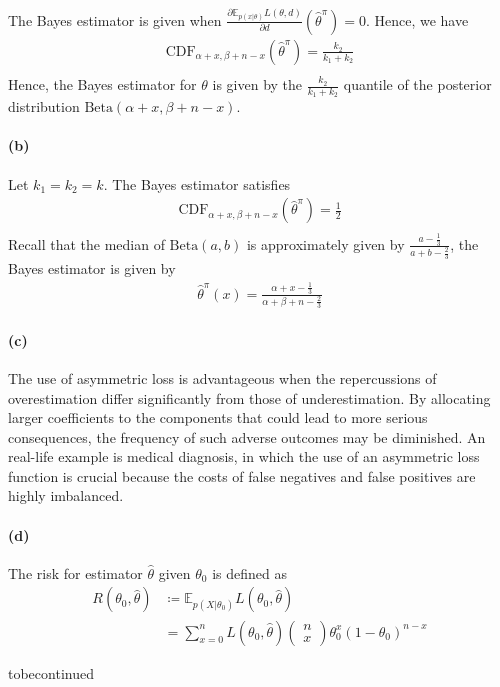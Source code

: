 The Bayes estimator is given when $\frac{\partial \mathbb{E}_{p(x \vert \theta)} L(\theta, d)}{\partial d} (\hat{\theta}^\pi) = 0$. Hence, we have
\begin{align*}
    \mathrm{CDF}_{\alpha+x, \beta+n-x}(\hat{\theta}^{\pi}) = \frac{k_2}{k_1+k_2}\\
\end{align*}
Hence, the Bayes estimator for $\theta$ is given by the $\frac{k_2}{k_1+k_2}$ quantile of the posterior distribution $\mathrm{Beta}(\alpha+x, \beta+n-x)$.

\paragraph{(b)}
Let $k_1 = k_2 = k$. The Bayes estimator satisfies
\begin{align*}
    \mathrm{CDF}_{\alpha+x, \beta+n-x}(\hat{\theta}^{\pi}) = \frac{1}{2}\\
\end{align*}
Recall that the median of $\mathrm{Beta}(a, b)$ is approximately given by $\frac{a-\frac{1}{3}}{a+b-\frac{2}{3}}$, the Bayes estimator is given by
\begin{align*}
    \hat{\theta}^{\pi}(x) = \frac{\alpha+x - \frac{1}{3}}{\alpha+\beta+n - \frac{2}{3}}
\end{align*}

\paragraph{(c)}
The use of asymmetric loss is advantageous when the repercussions of overestimation differ significantly from those of underestimation. By allocating larger coefficients to the components that could lead to more serious consequences, the frequency of such adverse outcomes may be diminished. An real-life example is medical diagnosis, in which the use of an asymmetric loss function is crucial because the costs of false negatives and false positives are highly imbalanced. 

\paragraph{(d)}
The risk for estimator $\hat{\theta}$ given $\theta_0$ is defined as
\begin{align*}
    R(\theta_0, \hat{\theta}) 
    &\coloneqq \mathbb{E}_{p(X \vert \theta_0)} L(\theta_0, \hat{\theta})\\
    &= \sum_{x=0}^{n} L(\theta_0, \hat{\theta}) \begin{pmatrix} n \\ x \end{pmatrix} \theta_0^{x} (1-\theta_0)^{n-x}
\end{align*}

{\color{red} tobecontinued}